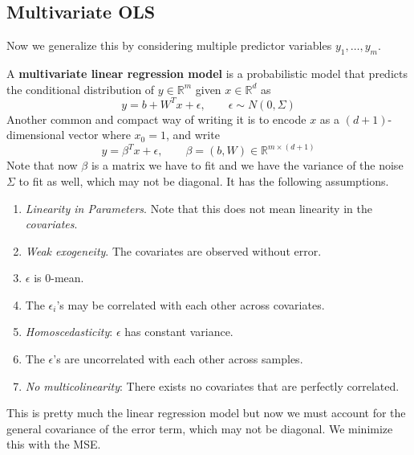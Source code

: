 \subsection{Multivariate OLS} 

  Now we generalize this by considering multiple predictor variables $y_1, \ldots, y_m$. 

  \begin{definition} 
    A \textbf{multivariate linear regression model} is a probabilistic model that predicts the conditional distribution of $y \in \mathbb{R}^{m}$ given $x \in \mathbb{R}^d$ as 
    \begin{equation}
      y = b + W^T x + \epsilon, \qquad \epsilon \sim N(0, \Sigma)
    \end{equation}
    Another common and compact way of writing it is to encode $x$ as a $(d+1)$-dimensional vector where $x_0 = 1$, and write 
    \begin{equation}
      y = \beta^T x + \epsilon, \qquad \beta = (b, W) \in \mathbb{R}^{m \times (d+1)}
    \end{equation}
    Note that now $\beta$ is a matrix we have to fit and we have the variance of the noise $\Sigma$ to fit as well, which may not be diagonal. It has the following assumptions.
    \begin{enumerate}
      \item \textit{Linearity in Parameters}. Note that this does not mean linearity in the \textit{covariates}.
      \item \textit{Weak exogeneity}. The covariates are observed without error. 
      \item $\epsilon$ is $0$-mean. 
      \item The $\epsilon_i$'s may be correlated with each other across covariates. 
      \item \textit{Homoscedasticity}: $\epsilon$ has constant variance. 
      \item The $\epsilon$'s are uncorrelated with each other across samples. 
      \item \textit{No multicolinearity}: There exists no covariates that are perfectly correlated. 
    \end{enumerate}
  \end{definition} 

  This is pretty much the linear regression model but now we must account for the general covariance of the error term, which may not be diagonal. We minimize this with the MSE. 


